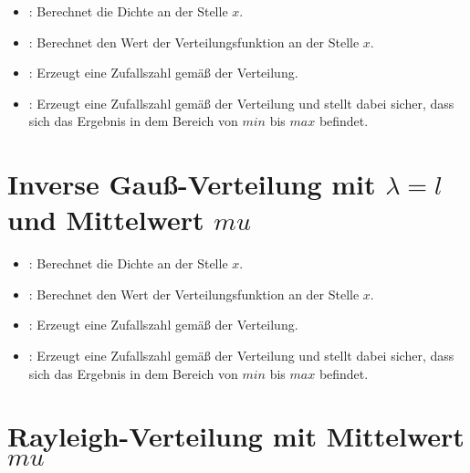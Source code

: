 \begin{itemize}

\item
{}:
Berechnet die Dichte an der Stelle $x$.

\item
{}:
Berechnet den Wert der Verteilungsfunktion an der Stelle $x$.

\item
{}:
Erzeugt eine Zufallszahl gemäß der Verteilung.

\item
{}:
Erzeugt eine Zufallszahl gemäß der Verteilung und stellt dabei sicher, dass sich das Ergebnis in dem Bereich von $min$ bis $max$ befindet.

\end{itemize}


	
\section{Inverse Gauß-Verteilung mit \texorpdfstring{$\lambda=l$}{l} und Mittelwert \texorpdfstring{$mu$}{mu}}

\begin{itemize}

\item
{}:
Berechnet die Dichte an der Stelle $x$.

\item
{}:
Berechnet den Wert der Verteilungsfunktion an der Stelle $x$.

\item
{}:
Erzeugt eine Zufallszahl gemäß der Verteilung.

\item
{}:
Erzeugt eine Zufallszahl gemäß der Verteilung und stellt dabei sicher, dass sich das Ergebnis in dem Bereich von $min$ bis $max$ befindet.

\end{itemize}



\section{Rayleigh-Verteilung mit Mittelwert \texorpdfstring{$mu$}{mu}}

